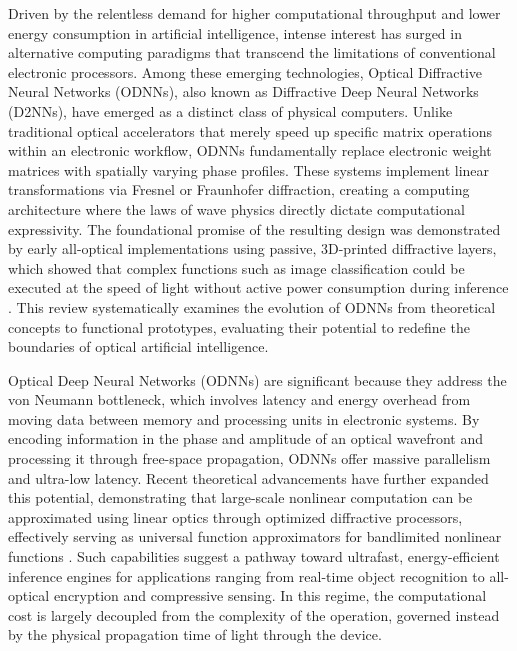 \documentclass[11pt]{article}
\begin{document}
Driven by the relentless demand for higher computational throughput and lower energy consumption in artificial intelligence, intense interest has surged in alternative computing paradigms that transcend the limitations of conventional electronic processors. Among these emerging technologies, Optical Diffractive Neural Networks (ODNNs), also known as Diffractive Deep Neural Networks (D2NNs), have emerged as a distinct class of physical computers. Unlike traditional optical accelerators that merely speed up specific matrix operations within an electronic workflow, ODNNs fundamentally replace electronic weight matrices with spatially varying phase profiles. These systems implement linear transformations via Fresnel or Fraunhofer diffraction, creating a computing architecture where the laws of wave physics directly dictate computational expressivity. The foundational promise of the resulting design was demonstrated by early all-optical implementations using passive, 3D-printed diffractive layers, which showed that complex functions such as image classification could be executed at the speed of light without active power consumption during inference \citep{doi_10_1126_science_aat8084_e055772d}. This review systematically examines the evolution of ODNNs from theoretical concepts to functional prototypes, evaluating their potential to redefine the boundaries of optical artificial intelligence.

Optical Deep Neural Networks (ODNNs) are significant because they address the von Neumann bottleneck, which involves latency and energy overhead from moving data between memory and processing units in electronic systems. By encoding information in the phase and amplitude of an optical wavefront and processing it through free-space propagation, ODNNs offer massive parallelism and ultra-low latency. Recent theoretical advancements have further expanded this potential, demonstrating that large-scale nonlinear computation can be approximated using linear optics through optimized diffractive processors, effectively serving as universal function approximators for bandlimited nonlinear functions \citep{doi_10_1186_s43593_025_00113_w_ca9e8e1e}. Such capabilities suggest a pathway toward ultrafast, energy-efficient inference engines for applications ranging from real-time object recognition to all-optical encryption and compressive sensing. In this regime, the computational cost is largely decoupled from the complexity of the operation, governed instead by the physical propagation time of light through the device.
\end{document}
